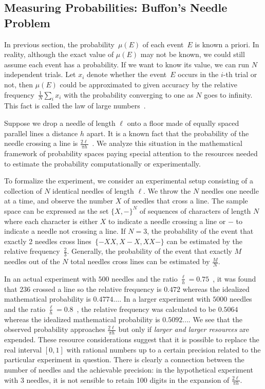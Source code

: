 \documentclass{article}
\theoremstyle{remark}
\newcommand{\pmeas}{\ensuremath{\mu}}
\begin{document}
\subsection{Measuring Probabilities: Buffon's Needle
Problem\label{subsec:Measuring-Probabilities:-Buffon}}
 
In previous section, the probability~$\pmeas(E)$ of each event~$E$
is known a priori. In reality, although the exact value of $\pmeas(E)$
may not be known, we could still assume each event has a probability.
If we want to know its value, we can run $N$ independent trials.
Let $x_{i}$ denote whether the event~$E$ occurs in the $i$-th
trial or not, then $\pmeas(E)$ could be approximated to given accuracy
by the relative frequency~$\frac{1}{N}\sum_{i}x_{i}$ with the probability
converging to one as $N$ goes to infinity. This fact is called the
law of large numbers~\cite{Bernoulli2006,Kolmogorov1950,Uspensky1937,Shafer1976,544199}.

Suppose we drop a needle of length $\ell$ onto a floor made of equally
spaced parallel lines a distance $h$ apart. It is a known fact that
the probability of the needle crossing a line is
$\frac{2\ell}{\pi h}$~\cite{Buffon1777,DeMorgan1872,Hall1873,Uspensky1937}.
We analyze this situation in the mathematical framework of probability
spaces paying special attention to the resources needed to estimate
the probability computationally or experimentally.

To formalize the experiment, we consider an experimental setup
consisting of a collection of $N$ identical needles of length
$\ell$. We throw the $N$ needles one needle at a time, and observe the number
$X$ of needles that cross a line. The sample space can be expressed as the set
$\{X,-\}^N$
of sequences of characters of length $N$ where each character is
either $X$ to indicate a needle crossing a line or $-$ to indicate a
needle not crossing a line. If $N=3$, the probability of the event that exactly
2 needles cross lines~$\{-XX,X{-}X,XX-\}$ can be 
estimated by the relative frequency~$\frac{2}{3}$. Generally, the probability of
the event that exactly $M$ needles out of the $N$ total needles cross lines can
be estimated by $\frac{M}{N}$.

In an actual experiment with $500$ needles and the ratio
$\frac{\ell}{h}=0.75$~\cite{Hall1873}, it was found that $236$ crossed
a line so the relative frequency is $0.472$ whereas the idealized
mathematical probability is $0.4774\ldots$. In a larger experiment
with $5000$ needles and the ratio
$\frac{\ell}{h}=0.8$~\cite{Uspensky1937}, the relative frequency was
calculated to be $0.5064$ whereas the idealized mathematical
probability is $0.5092\ldots$. We see that the observed probability
approaches $\frac{2\ell}{\pi h}$ but only if \emph{larger and larger
  resources} are expended. These resource considerations suggest that
it is possible to replace the real interval $[0,1]$ with rational
numbers up to a certain precision related to the particular experiment
in question.  There is clearly a connection between the number of
needles and the achievable precision: in the hypothetical experiment
with 3 needles, it is not sensible to retain 100 digits in the
expansion of $\frac{2\ell}{\pi h}$.
\end{document}
